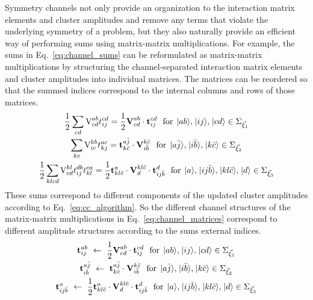 \documentclass[thesis.tex]{subfiles}
\begin{document}
Symmetry channels not only provide an organization to the interaction matrix elements and cluster amplitudes and remove any terms that violate the underlying symmetry of a problem, but they also naturally provide an efficient way of performing sums using matrix-matrix multiplications.  For example, the sums in Eq.\ \eqref{eq:channel_sums} can be reformulated as matrix-matrix multiplications by structuring the channel-separated interaction matrix elements and cluster amplitudes into individual matrices.  The matrices can be reordered so that the summed indices correspond to the internal columns and rows of those matrices.
\begin{gather} \label{eq:channel_matrices}
  \frac{1}{2}\sum\limits_{\mathclap{cd}}\vint{ab}{cd}\tamp{cd}{ij} = \frac{1}{2}\bvint{ab}{cd}\cdot\btamp{cd}{ij}\ \ \text{for}\ \ket{ab},\ket{ij},\ket{cd} \in \Sigma_{\vec{\xi}_{1}} \notag \\
  \sum\limits_{\mathclap{kc}}\vint{kb}{ic}\tamp{ac}{kj} = \btamp{a\bar{j}}{k\bar{c}}\cdot\bvint{k\bar{c}}{i\bar{b}}\ \ \text{for}\ \ket{a\bar{j}},\ket{i\bar{b}},\ket{k\bar{c}} \in \Sigma_{\vec{\xi}_{2}} \notag \\
  \frac{1}{2}\sum\limits_{\mathclap{klcd}}\vint{kl}{cd}\tamp{db}{ij}\tamp{ca}{kl} = \frac{1}{2}\btamp{a}{kl\bar{c}}\cdot\bvint{kl\bar{c}}{d}\cdot\btamp{d}{ij\bar{b}}\ \ \text{for}\ \ket{a},\ket{ij\bar{b}},\ket{kl\bar{c}},\ket{d} \in \Sigma_{\vec{\xi}_{3}}
\end{gather}
These sums correspond to different components of the updated cluster amplitudes according to Eq.\ \eqref{eq:cc_algorithm}.  So the different channel structures of the matrix-matrix multiplications in Eq.\ \eqref{eq:channel_matrices} correspond to different amplitude structures according to the sums external indices.
\begin{gather} \label{eq:amp_matrices}
  \btamp{ab}{ij}\ \leftarrow\ \frac{1}{2}\bvint{ab}{cd}\cdot\btamp{cd}{ij}\ \ \text{for}\ \ket{ab},\ket{ij},\ket{cd} \in \Sigma_{\vec{\xi}_{1}} \notag \\
  \btamp{a\bar{j}}{i\bar{b}}\ \leftarrow\ \btamp{a\bar{j}}{k\bar{c}}\cdot\bvint{k\bar{c}}{i\bar{b}}\ \ \text{for}\ \ket{a\bar{j}},\ket{i\bar{b}},\ket{k\bar{c}} \in \Sigma_{\vec{\xi}_{2}} \notag \\
  \btamp{a}{ij\bar{b}}\ \leftarrow\ \frac{1}{2}\btamp{a}{kl\bar{c}}\cdot\bvint{kl\bar{c}}{d}\cdot\btamp{d}{ij\bar{b}}\ \ \text{for}\ \ket{a},\ket{ij\bar{b}},\ket{kl\bar{c}},\ket{d} \in \Sigma_{\vec{\xi}_{3}}
\end{gather}
\end{document}

